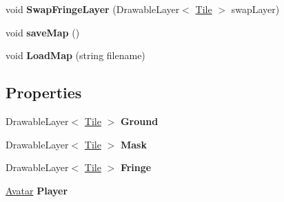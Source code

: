 \begin{DoxyCompactItemize}
\item 
\hypertarget{class_tile_engine_1_1_map_a7387df79a406ca23119ce40c2fa6f1d9}{void {\bfseries Swap\-Fringe\-Layer} (Drawable\-Layer$<$ \hyperlink{class_tile_engine_1_1_tile}{Tile} $>$ swap\-Layer)}\label{class_tile_engine_1_1_map_a7387df79a406ca23119ce40c2fa6f1d9}

\item 
\hypertarget{class_tile_engine_1_1_map_afee605561b80396694c1acbaae6d219d}{void {\bfseries save\-Map} ()}\label{class_tile_engine_1_1_map_afee605561b80396694c1acbaae6d219d}

\item 
\hypertarget{class_tile_engine_1_1_map_a1ee45c38c5f3b51cdc59b5deb05a5bc2}{void {\bfseries Load\-Map} (string filename)}\label{class_tile_engine_1_1_map_a1ee45c38c5f3b51cdc59b5deb05a5bc2}

\end{DoxyCompactItemize}
\subsection*{Properties}
\begin{DoxyCompactItemize}
\item 
\hypertarget{class_tile_engine_1_1_map_a93d6a67a5388e1ad95245cb459847270}{Drawable\-Layer$<$ \hyperlink{class_tile_engine_1_1_tile}{Tile} $>$ {\bfseries Ground}}\label{class_tile_engine_1_1_map_a93d6a67a5388e1ad95245cb459847270}

\item 
\hypertarget{class_tile_engine_1_1_map_a298d145d16f3dc824a0c0875434ffa0b}{Drawable\-Layer$<$ \hyperlink{class_tile_engine_1_1_tile}{Tile} $>$ {\bfseries Mask}}\label{class_tile_engine_1_1_map_a298d145d16f3dc824a0c0875434ffa0b}

\item 
\hypertarget{class_tile_engine_1_1_map_abe95706f37041feb1285be80522abbb3}{Drawable\-Layer$<$ \hyperlink{class_tile_engine_1_1_tile}{Tile} $>$ {\bfseries Fringe}}\label{class_tile_engine_1_1_map_abe95706f37041feb1285be80522abbb3}

\item 
\hypertarget{class_tile_engine_1_1_map_a8cc2e7e3754056565eb5cb9250d62ceb}{\hyperlink{class_tile_engine_1_1_avatar}{Avatar} {\bfseries Player}}\label{class_tile_engine_1_1_map_a8cc2e7e3754056565eb5cb9250d62ceb}

\end{DoxyCompactItemize}


